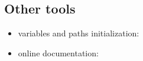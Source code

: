 \subsection{Other tools}
\begin{itemize}
\item \healpix variables and paths initialization: 
\item online documentation: 
\end{itemize}


%  
% 
% 
